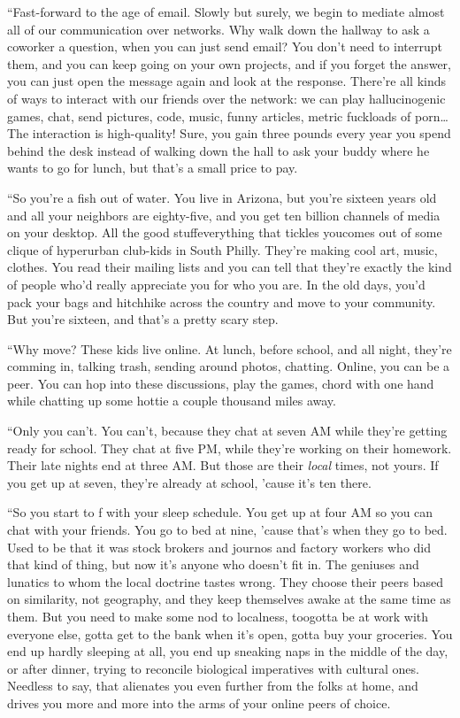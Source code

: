“Fast-forward to the age of email. Slowly but surely, we begin to
mediate almost all of our communication over networks. Why walk
down the hallway to ask a coworker a question, when you can just
send email? You don’t need to interrupt them, and you can keep
going on your own projects, and if you forget the answer, you can
just open the message again and look at the response. There’re all
kinds of ways to interact with our friends over the network: we can
play hallucinogenic games, chat, send pictures, code, music, funny
articles, metric fuckloads of porn\ldots{} The interaction is
high-quality! Sure, you gain three pounds every year you spend
behind the desk instead of walking down the hall to ask your buddy
where he wants to go for lunch, but that’s a small price to pay.

“So you’re a fish out of water. You live in Arizona, but you’re
sixteen years old and all your neighbors are eighty-five, and you
get ten billion channels of media on your desktop. All the good
stuff{\dash}everything that tickles you{\dash}comes out of some clique of
hyperurban club-kids in South Philly. They’re making cool art,
music, clothes. You read their mailing lists and you can tell that
they’re exactly the kind of people who’d really appreciate you for
who you are. In the old days, you’d pack your bags and hitchhike
across the country and move to your community. But you’re sixteen,
and that’s a pretty scary step.

“Why move? These kids live online. At lunch, before school, and all
night, they’re comming in, talking trash, sending around photos,
chatting. Online, you can be a peer. You can hop into these
discussions, play the games, chord with one hand while chatting up
some hottie a couple thousand miles away.

“Only you can’t. You can’t, because they chat at seven AM while
they’re getting ready for school. They chat at five PM, while
they’re working on their homework. Their late nights end at three
AM. But those are their \emph{local} times, not yours. If you get
up at seven, they’re already at school, ’cause it’s ten there.

“So you start to f with your sleep schedule. You get up at four AM
so you can chat with your friends. You go to bed at nine, ’cause
that’s when they go to bed. Used to be that it was stock brokers
and journos and factory workers who did that kind of thing, but now
it’s anyone who doesn’t fit in. The geniuses and lunatics to whom
the local doctrine tastes wrong. They choose their peers based on
similarity, not geography, and they keep themselves awake at the
same time as them. But you need to make some nod to localness,
too{\dash}gotta be at work with everyone else, gotta get to the bank when
it’s open, gotta buy your groceries. You end up hardly sleeping at
all, you end up sneaking naps in the middle of the day, or after
dinner, trying to reconcile biological imperatives with cultural
ones. Needless to say, that alienates you even further from the
folks at home, and drives you more and more into the arms of your
online peers of choice.

